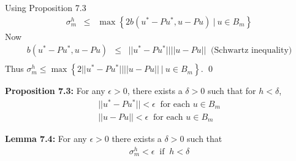 \documentclass[../../main.tex]{subfiles}
\begin{document}
Using Proposition 7.3
\begin{eqnarray*}
\sigma_{m}^{h} &\leq & \max\left\{ 2b(u^{*} - Pu^{*}, u -Pu) \ | \ u \in B_{m} \right \}			
\end{eqnarray*}
Now
\begin{eqnarray*}
b(u^{*} - Pu^{*}, u -Pu) & \leq & ||u^{*} - Pu^{*}||||u -Pu|| \ \textrm{ (Schwartz inequality)} \\
\end{eqnarray*}
Thus  $\sigma_{m}^{h} \leq \max \left\{2||u^{*}- Pu^{*}|| ||u-Pu|| \ | \ u \in B_{m} \right\}$. \qed


\textbf{Proposition 7.3:} For any $\epsilon > 0$, there exists a $\delta >0$ such that for $h<\delta$,
\begin{eqnarray*}
||u^{*} - Pu^{*}|| < \epsilon \ \textrm{ for each } u \in B_{m}\\
||u - Pu|| < \epsilon \ \textrm{ for each } u \in B_{m}
\end{eqnarray*}

\begin{comment}
\textbf{Proof:}
Suppose we have a set of basis functions $\Phi \subset S^{h}$ such that each element in $\Phi$ has order k, i.e. for each $v \in \Phi$, $v^{(k)} = 0$. Now from the definition of the Rayleigh-Ritz Projection, we have that $Pu$ is the closest element in $S^{h}$ to $u$. In particular, $||u-Pu||\leq ||u-\Pi u||$, where $\Pi u$ is the interpolant of $u$ into $S^{h}$.\\


Now from, we use the Approximation Theorem, so that we have
\begin{eqnarray*}
||u - \Pi u|| \leq Ch^{k}||u^{(k)}||
\end{eqnarray*}
So for any $\epsilon > 0$, we can find a $\delta$ such that if $h<\delta$ then
\begin{eqnarray*}
||u - Pu|| \leq ||u - \Pi u|| \leq \epsilon
\end{eqnarray*}
A similar argument for $||u^{*} - Pu^{*}||$ proves the theorem.
\qed
\\
\end{comment}

\textbf{Lemma 7.4:} For any $\epsilon >0$ there exists a $\delta > 0$ such that
\begin{eqnarray*}
\sigma_{m}^{h} < \epsilon \ \textrm{ if } \ h < \delta
\end{eqnarray*}

\begin{comment}
\textbf{Proof:} For any $\epsilon > 0$ there exists a $\delta > 0$ such that if $h<\delta$, then
\begin{eqnarray*}
||u-Pu|| < \epsilon \ \textrm{ for each } \ u \in B_{m}
\end{eqnarray*}
This, together with Lemma 7.2 and Proposition 7.4 gives the result.\qed\\
\end{comment}
\end{document}

